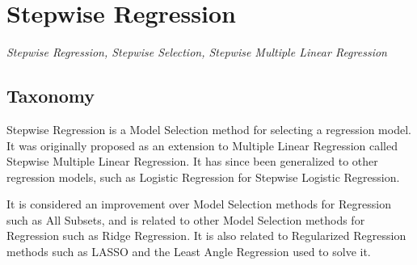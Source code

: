 

\section{Stepwise Regression} 
\label{sec:stepwise}

\emph{Stepwise Regression, Stepwise Selection, Stepwise Multiple Linear Regression}

\subsection{Taxonomy}
Stepwise Regression is a Model Selection method for selecting a regression model. It was originally proposed as an extension to Multiple Linear Regression called Stepwise Multiple Linear Regression. It has since been generalized to other regression models, such as Logistic Regression for Stepwise Logistic Regression.

It is considered an improvement over Model Selection methods for Regression such as All Subsets, and is related to other Model Selection methods for Regression such as Ridge Regression. It is also related to Regularized Regression methods such as LASSO and the Least Angle Regression used to solve it.

